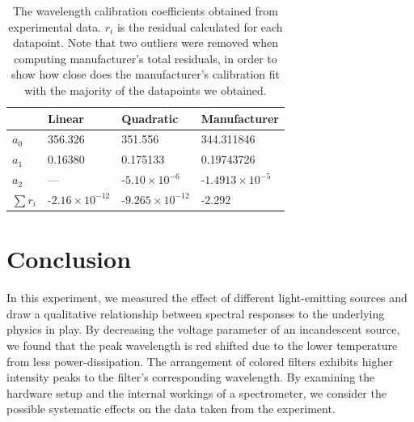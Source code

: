 \documentclass[authoryear, 12pt,5p, times]{elsarticle}
\begin{document}
%
\begin{table}
    \begin{tabular}{|l|l|l|l|}
    \hline
    ~                            & Linear                             & Quadratic                        & Manufacturer\\ \hline
    $a_0$                     & 356.326                              & 351.556                              & 344.311846                              \\ \hline
    $a_1$                     & 0.16380                              & 0.175133                             & 0.19743726                              \\ \hline
    $a_2$                     & ---                                  & -$5.10\times10^{-6}$   &-$1.4913\times10^{-5}$    \\ \hline
    $\sum r_i$ & -$2.16\times10^{-12}$ & -$9.265\times10^{-12}$ & -2.292                                  \\ \hline
    \end{tabular}
    \caption{The wavelength calibration coefficients obtained from experimental data. $r_i$ is the residual calculated for each datapoint. Note that two outliers were removed when computing manufacturer's total residuals, in order to show how close does the manufacturer's calibration fit with the majority of the datapoints we obtained.}
    \label{table}
\end{table}
\section{Conclusion}
In this experiment, we measured the effect of different light-emitting sources and draw a qualitative relationship between spectral responses to the underlying physics in play. By decreasing the voltage parameter of an incandescent source, we found that the peak wavelength is red shifted due to the lower temperature from less power-dissipation. The arrangement of colored filters exhibits higher intensity peaks to the filter's corresponding wavelength. By examining the hardware setup and the internal workings of a spectrometer, we consider the possible systematic effects on the data taken from the experiment. 
\end{document}
